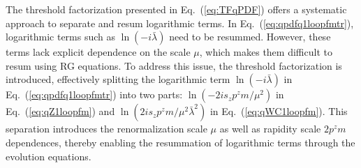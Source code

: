 \documentclass[a4paper,11pt]{article}
\begin{document}
\iffalse
The threshold factorization presented in Eq.~(\ref{eq:TFqPDF}) offers a systematic approach to separate and resum logarithmic terms. In Eq.~(\ref{eq:qpdfq1loopfmtr}), logarithmic terms such as $\ln\left(-i \bar{\lambda}\right)$ need to be resummed. However, these terms lack explicit dependence on the scale $\mu$, which makes them difficult to resum using RG equations. To address this issue, the threshold factorization is introduced, effectively splitting the logarithmic term $\ln(-i \bar{\lambda})$ in Eq.~(\ref{eq:qpdfq1loopfmtr}) into two parts: $\ln\left(-2 i s_z p^z m/\mu^2\right)$ in Eq.~(\ref{eq:qZ1loopfm}) and $\ln\left(2 i s_z p^z m/\mu^2 \bar{\lambda}^2\right)$ in Eq.~(\ref{eq:qWC1loopfm}). This separation introduces the renormalization scale $\mu$ as well as rapidity scale $2 p^z m$ dependences, thereby enabling the resummation of logarithmic terms through the evolution equations. 
\end{document}
